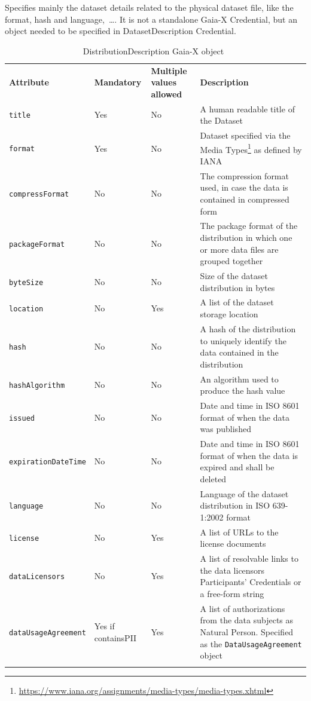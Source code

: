 Specifies mainly the dataset details related to the physical dataset file, like the format, hash and language,~\ldots.
It is not a standalone Gaia-X Credential, but an object needed to be specified in DatasetDescription Credential.

\begin{longtable}{ |p{4cm}|p{2cm}|p{2cm}|p{7cm}| }
    \hhline{----}
    \textbf{Attribute} & \textbf{Mandatory} & \textbf{Multiple values allowed} & \textbf{Description}\\
    \hhline{----}
    \texttt{title} & Yes & No & A human readable title of the Dataset\\
    \hhline{----}
    \texttt{format} & Yes & No & Dataset specified via the Media Types\footnote{\url{https://www.iana.org/assignments/media-types/media-types.xhtml}} as defined by IANA\\
    \hhline{----}
    \texttt{compressFormat} & No & No & The compression format used, in case the data is contained in compressed form\\
    \hhline{----}
    \texttt{packageFormat} & No & No & The package format of the distribution in which one or more data files are grouped together\\
    \hhline{----}
    \texttt{byteSize} & No & No & Size of the dataset distribution in bytes\\
    \hhline{----}
    \texttt{location} & No & Yes & A list of the dataset storage location\\
    \hhline{----}
    \texttt{hash} & No & No & A hash of the distribution to uniquely identify the data contained in the distribution\\
    \hhline{----}
    \texttt{hashAlgorithm} & No & No & An algorithm used to produce the hash value\\
    \hhline{----}
    \texttt{issued} & No & No & Date and time in ISO 8601 format of when the data was published\\
    \hhline{----}
    \texttt{expirationDateTime} & No & No & Date and time in ISO 8601 format of when the data is expired and shall be deleted\\
    \hhline{----}
    \texttt{language} & No & No & Language of the dataset distribution in ISO 639-1:2002 format\\
    \hhline{----}
    \texttt{license} & No & Yes & A list of URLs to the license documents\\
    \hhline{----}
    \texttt{dataLicensors} & No & Yes & A list of resolvable links to the data licensors Participants' Credentials or a free-form string\\
    \hhline{----}
    \texttt{dataUsageAgreement} & Yes if containsPII & Yes & A list of authorizations from the data subjects as Natural Person.
    Specified as the \texttt{DataUsageAgreement} object\\
    \hhline{----}
    \caption{DistributionDescription Gaia-X object~\cite{gaiax_data_exchange_document}}
    \label{tab:distribution_description}
\end{longtable}

